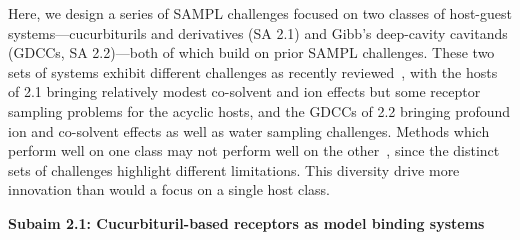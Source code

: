 \documentclass[11pt]{article}
\begin{document}
Here, we design a series of SAMPL challenges focused on two classes of host-guest systems---cucurbiturils and derivatives (SA 2.1) and Gibb's deep-cavity cavitands (GDCCs, SA 2.2)---both of which build on prior SAMPL challenges.
These two sets of systems exhibit different challenges as recently reviewed~\cite{mobley_predicting_2016}, with the hosts of 2.1 bringing relatively modest co-solvent and ion effects but some receptor sampling problems for the acyclic hosts, and the GDCCs of 2.2 bringing profound ion and co-solvent effects as well as water sampling challenges.
Methods which perform well on one class may not perform well on the other~\cite{mobley_predicting_2016}, since the distinct sets of challenges highlight different limitations.
This diversity drive more innovation than would a focus on a single host class.



{\bf Subaim 2.1: Cucurbituril-based receptors as model binding systems}
\end{document}

